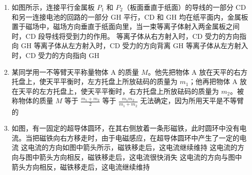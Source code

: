 \documentclass[\gkver]{gaokaozhenti}
\begin{document}
\begin{enumerate}
{
}

\item
如图所示，连接平行金属板 $P_{1}$ 和 $P_{2}$（板面垂直于纸面）的导线的一部分 CD 和另一连接电池的回路的一部分 GH 平行，CD 和 GH 均在纸平面内，金属板置于磁场中，磁场方向垂直于纸面向里，当一束等离子体射入两金属板之间时，CD 段导线将受到力的作用。
{等离子体从右方射入时，CD 受力的方向指向 GH}
{等离子体从左方射入时，CD 受力的方向背离 GH}
{等离子体从左方射入时，CD 受力的方向指向 GH}


\item
某同学用一不等臂天平称量物体 A 的质量 $M$。他先把物体 A 放在天平的右方托盘上，使天平平衡时，左方托盘上所放砝码的质量为 $m_{1}$；他再把物体 A 放在天平的左方托盘上，使天平平衡时，右方托盘上所放砝码的质量为 $m_{2}$。被称物体的质量 $M$
{等于 $\frac{m_{1}+m_{2}}{2}$}
{等于 $\frac{m_{1}m_{2}}{m_{1}+m_{2}}$}
{无法确定，因为所用天平是不等臂的}


\item
如图，有一固定的超导体圆环，在其右侧放着一条形磁铁，此时圆环中没有电流。当把磁铁向右方移走时，由于电磁感应，在超导体圆环中产生了一定的电流
{这电流的方向如图中箭头所示，磁铁移走后，这电流继续维持}
{这电流的方向与图中箭头方向相反，磁铁移走后，这电流很快消失}
{这电流的方向与图中箭头方向相反，磁铁移走后，这电流继续维持}


\end{enumerate}
\end{document}
